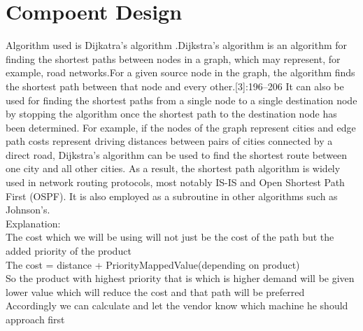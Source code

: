 \documentclass[oneside,a4paper,12pt]{report}
\begin{document}
\section{Compoent Design} 
Algorithm used is Dijkatra's algorithm .Dijkstra's algorithm is an algorithm for finding the shortest paths between nodes in a graph, which may represent, for example, road networks.For a given source node in the graph, the algorithm finds the shortest path between that node and every other.[3]:196–206 It can also be used for finding the shortest paths from a single node to a single destination node by stopping the algorithm once the shortest path to the destination node has been determined. For example, if the nodes of the graph represent cities and edge path costs represent driving distances between pairs of cities connected by a direct road, Dijkstra's algorithm can be used to find the shortest route between one city and all other cities. As a result, the shortest path algorithm is widely used in network routing protocols, most notably IS-IS and Open Shortest Path First (OSPF). It is also employed as a subroutine in other algorithms such as Johnson's.\\
Explanation: \\
The cost which we will be using will not just be the cost of the path but the added priority of the product\\
The cost = distance + PriorityMappedValue(depending on product) \\
So the product with highest priority that is which is higher demand  will be given lower value which will reduce the cost and that path will be preferred\\
Accordingly we can calculate and let the vendor know which machine he should approach first\\ 
\end{document}
